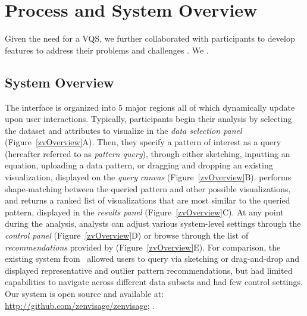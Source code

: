  
 \section{ Process and System Overview\label{sec:pd_findings}}
 Given the need for a VQS, we further collaborated with participants to develop features to address their problems and challenges . We .
 \subsection{System Overview\label{sec:system}}%
  The \zvpp interface is organized into 5 major regions all of which dynamically update upon user interactions. Typically, participants begin their analysis by selecting the dataset and attributes to visualize in the \emph{data selection panel} (Figure~\ref{zvOverview}A). Then, they specify a pattern of interest as a query (hereafter referred to as \emph{pattern query}), through either sketching, inputting an equation, uploading a data pattern, or dragging and dropping an existing visualization, displayed on the \emph{query canvas} (Figure~\ref{zvOverview}B). \zvpp performs shape-matching between the queried pattern and other possible visualizations, and returns a ranked list of visualizations that are most similar to the queried pattern, displayed in the \emph{results panel} (Figure~\ref{zvOverview}C). At any point during the analysis, analysts can adjust various system-level settings through the \emph{control panel} (Figure~\ref{zvOverview}D) or browse through the list of \emph{recommendations} provided by \zvpp (Figure~\ref{zvOverview}E). For comparison, the existing \zv system from~\cite{Siddiqui2017} allowed users to query via sketching or drag-and-drop and displayed representative and outlier pattern recommendations, but had limited capabilities to navigate across different data subsets and had few control settings. Our \zvpp system is open source and available at: \url{http://github.com/zenvisage/zenvisage}; . %
